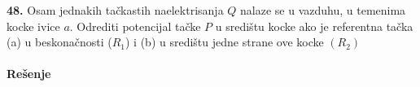\textbf{\Large 48.} Osam jednakih ta\v{c}kastih naelektrisanja $Q$ nalaze se u vazduhu, u temenima kocke ivice $a$. Odrediti potencijal ta\v{c}ke $P$ u sredi\v{s}tu kocke ako je referentna ta\v{c}ka (a) u beskona\v{c}nosti ($R_1$) i (b) u sredi\v{s}tu jedne strane ove kocke $(R_2)$
\\\\
\textbf{\Large Re\v{s}enje}\\
